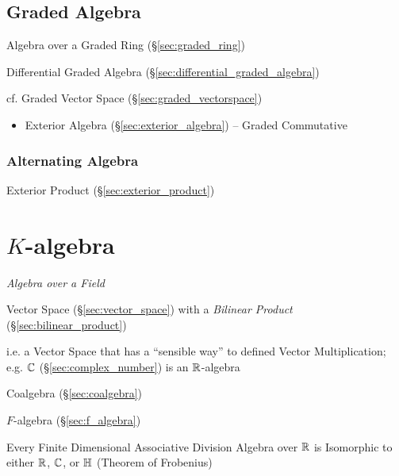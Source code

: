 \subsection{Graded Algebra}\label{sec:graded_algebra}

Algebra over a Graded Ring (\S\ref{sec:graded_ring})

Differential Graded Algebra (\S\ref{sec:differential_graded_algebra})

cf. Graded Vector Space (\S\ref{sec:graded_vectorspace})

\begin{itemize}
  \item Exterior Algebra (\S\ref{sec:exterior_algebra}) -- Graded Commutative
\end{itemize}



\subsubsection{Alternating Algebra}\label{sec:alternating_algebra}

Exterior Product (\S\ref{sec:exterior_product})



\section{$K$-algebra}\label{sec:k_algebra}

\emph{Algebra over a Field}

Vector Space (\S\ref{sec:vector_space}) with a \emph{Bilinear Product}
(\S\ref{sec:bilinear_product})

i.e. a Vector Space that has a ``sensible way'' to defined Vector
Multiplication; e.g. $\mathbb{C}$ (\S\ref{sec:complex_number}) is an
$\mathbb{R}$-algebra

Coalgebra (\S\ref{sec:coalgebra})

$F$-algebra (\S\ref{sec:f_algebra})

Every Finite Dimensional Associative Division Algebra over $\mathbb{R}$ is
Isomorphic to either $\mathbb{R}$, $\mathbb{C}$, or $\mathbb{H}$ (Theorem of
Frobenius) %



